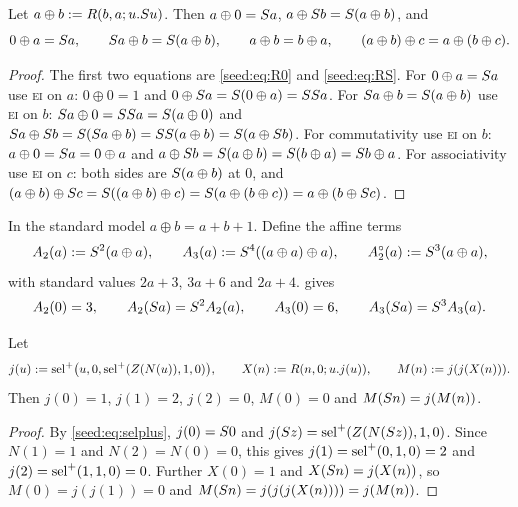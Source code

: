 \begin{lemma}\label{seed:lem:succ-oplus}
Let $a\oplus b\mathrel{:=} R(b,a;u.S u)$. Then $a\oplus0=S a$,
$a\oplus S b=S(a\oplus b)$, and
\[
 0\oplus a=S a,\qquad S a\oplus b=S(a\oplus b),\qquad
 a\oplus b=b\oplus a,\qquad (a\oplus b)\oplus c=a\oplus(b\oplus c).
\]
\end{lemma}

\begin{proof}
The first two equations are \eqref{seed:eq:R0} and \eqref{seed:eq:RS}. For
$0\oplus a=S a$ use \textsc{ei} on $a$: $0\oplus0=1$ and
$0\oplus S a=S(0\oplus a)=SS a$. For
$S a\oplus b=S(a\oplus b)$ use \textsc{ei} on $b$:
$S a\oplus0=SS a=S(a\oplus0)$ and
$S a\oplus S b=S(S a\oplus b)=SS(a\oplus b)
=S(a\oplus S b)$. For commutativity use \textsc{ei} on $b$:
$a\oplus0=S a=0\oplus a$ and
$a\oplus S b=S(a\oplus b)=S(b\oplus a)=S b\oplus a$. For
associativity use \textsc{ei} on $c$: both sides are $S(a\oplus b)$ at
$0$, and
$(a\oplus b)\oplus S c=S((a\oplus b)\oplus c)=S(a\oplus(b\oplus c))
=a\oplus(b\oplus S c)$.
\end{proof}

In the standard model $a\oplus b=a+b+1$. Define the affine terms
\[
 A_2(a)\mathrel{:=}S^2(a\oplus a),\qquad
 A_3(a)\mathrel{:=}S^4((a\oplus a)\oplus a),\qquad
 A_2^{\circ}(a)\mathrel{:=}S^3(a\oplus a),
\]
with standard values $2a+3$, $3a+6$ and $2a+4$. 
gives
\begin{equation}\label{seed:eq:affine}
 A_2(0)=3,\qquad A_2(S a)=S^2A_2(a),\qquad
 A_3(0)=6,\qquad A_3(S a)=S^3A_3(a).
\end{equation}

\begin{lemma}\label{seed:lem:succ-cycle}
Let
\[
 j(u)\mathrel{:=}\operatorname{sel}^{+}\bigl(u,0,\operatorname{sel}^{+}(Z(N(u)),1,0)\bigr),\qquad
 X(n)\mathrel{:=} R(n,0;u.j(u)),\qquad M(n)\mathrel{:=} j(j(X(n))).
\]
Then $j(0)=1$, $j(1)=2$, $j(2)=0$, $M(0)=0$ and $M(S n)=j(M(n))$.
\end{lemma}

\begin{proof}
By \eqref{seed:eq:selplus}, $j(0)=S 0$ and
$j(S z)=\operatorname{sel}^{+}(Z(N(S z)),1,0)$. Since $N(1)=1$ and $N(2)=N(0)=0$,
this gives $j(1)=\operatorname{sel}^{+}(0,1,0)=2$ and $j(2)=\operatorname{sel}^{+}(1,1,0)=0$. Further
$X(0)=1$ and $X(S n)=j(X(n))$, so $M(0)=j(j(1))=0$ and
$M(S n)=j(j(j(X(n))))=j(M(n))$.
\end{proof}

